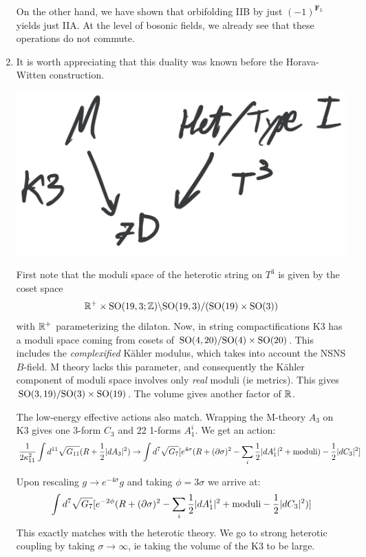 \documentclass[11pt, class=article, crop=false]{standalone}
\begin{document}
\begin{enumerate}
	On the other hand, we have shown that orbifolding IIB by just $(-1)^{\mathbf{F}_L}$ yields just IIA. At the level of bosonic fields, we already see that these operations do not commute. 
	
	\item It is worth appreciating that this duality was known before the Horava-Witten construction.
	
	\begin{center}
		\includegraphics[scale=0.13]{"Drawings/M Type I"}
	\end{center}
	
	First note that the moduli space of the heterotic string on $T^3$ is given by the coset space 
	\[
		\mathbb{R}^+ \times \mathrm{SO}(19,3;\mathbb{Z})\backslash \mathrm{SO}(19,3)/(\mathrm{SO}(19) \times \mathrm{SO}(3))
	\]
	with $\mathbb{R}^+$ parameterizing the dilaton. Now, in string compactifications K3 has a moduli space coming from cosets of $\mathrm{SO}(4, 20)/\mathrm{SO}(4) \times \mathrm{SO}(20)$. This includes the \emph{complexified} K\"ahler modulus, which takes into account the NSNS $B$-field. M theory lacks this parameter, and consequently the K\"ahler component of moduli space involves only \emph{real} moduli (ie metrics). This gives $\mathrm{SO}(3, 19)/\mathrm{SO}(3) \times \mathrm{SO}(19)$. The volume gives another factor of $\mathbb{R}$.
	
	The low-energy effective actions also match. Wrapping the M-theory $A_3$ on K3 gives one 3-form $C_3$ and 22 1-forms $A_1^i$. We get an action:
	\[
		\frac{1}{2 \kappa_{11}^2}\int d^{11} \sqrt{G_{11}} (R + \frac12 |dA_3|^2)  \to \int   d^{7} \sqrt{G_{7}} [e^{4 \sigma} (R + (\partial \sigma)^2 - \sum_i \frac12 |dA_1^i|^2  + \text{moduli} ) - \frac12 |dC_3|^2]
	\]
	
	Upon rescaling $g \to e^{-4\sigma} g$ and taking $\phi = 3 \sigma$ we arrive at:
	\[
		\int   d^{7} \sqrt{G_{7}} [e^{-2 \phi} (R + (\partial \sigma)^2 - \sum_i \frac12 |dA_1^i|^2  + \text{moduli} - \frac12 |dC_3|^2) ]
	\]
	This exactly matches with the heterotic theory. We go to strong heterotic coupling by taking $\sigma \to \infty$, ie taking the volume of the K3 to be large. 
	

\end{enumerate}
\end{document}

